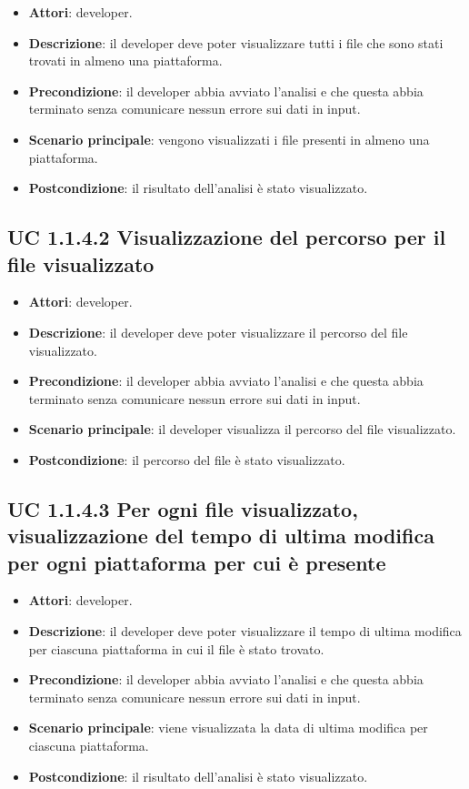 		\begin{itemize}
			\item\textbf{Attori}: developer.
			\item\textbf{Descrizione}: il developer deve poter visualizzare tutti i file che sono stati trovati in almeno una piattaforma.
			\item\textbf{Precondizione}: il developer abbia avviato l'analisi e che questa abbia terminato senza comunicare nessun errore sui dati in input.
			\item\textbf{Scenario principale}: vengono visualizzati i file presenti in almeno una piattaforma.
			\item\textbf{Postcondizione}: il risultato dell'analisi è stato visualizzato.
		\end{itemize}
	
	\subsection{UC 1.1.4.2 Visualizzazione del percorso per il file visualizzato}
		\label{subsec:UC1.1.4.2}
	
		\begin{itemize}
			\item\textbf{Attori}: developer.
			\item\textbf{Descrizione}: il developer deve poter visualizzare il percorso del file visualizzato.
			\item\textbf{Precondizione}: il developer abbia avviato l'analisi e che questa abbia terminato senza comunicare nessun errore sui dati in input.
			\item\textbf{Scenario principale}: il developer visualizza il percorso del file visualizzato.
			\item\textbf{Postcondizione}: il percorso del file è stato visualizzato.
		\end{itemize}

	\subsection{UC 1.1.4.3 Per ogni file visualizzato, visualizzazione del tempo di ultima modifica per ogni piattaforma per cui è presente}
		\label{subsec:UC1.1.4.3}
		
		\begin{itemize}
			\item\textbf{Attori}: developer.
			\item\textbf{Descrizione}: il developer deve poter visualizzare il tempo di ultima modifica per ciascuna piattaforma in cui il file è stato trovato.
			\item\textbf{Precondizione}: il developer abbia avviato l'analisi e che questa abbia terminato senza comunicare nessun errore sui dati in input.
			\item\textbf{Scenario principale}: viene visualizzata la data di ultima modifica per ciascuna piattaforma.
			\item\textbf{Postcondizione}: il risultato dell'analisi è stato visualizzato.
		\end{itemize}
		
